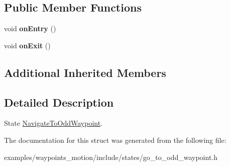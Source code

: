 \subsection*{Public Member Functions}
\begin{DoxyCompactItemize}
\item 
\mbox{\label{structNavigateToOddWaypoint_1_1NavigateToOddWaypoint_a90a02cb4090f1274da0c101452afa87e}} 
void {\bfseries on\+Entry} ()
\item 
\mbox{\label{structNavigateToOddWaypoint_1_1NavigateToOddWaypoint_a6f4e1c3d45882b6bb75b4d4f9c1d2549}} 
void {\bfseries on\+Exit} ()
\end{DoxyCompactItemize}
\subsection*{Additional Inherited Members}


\subsection{Detailed Description}
State \hyperlink{structNavigateToOddWaypoint_1_1NavigateToOddWaypoint}{Navigate\+To\+Odd\+Waypoint}. 

The documentation for this struct was generated from the following file\+:\begin{DoxyCompactItemize}
\item 
examples/waypoints\+\_\+motion/include/states/go\+\_\+to\+\_\+odd\+\_\+waypoint.\+h\end{DoxyCompactItemize}
